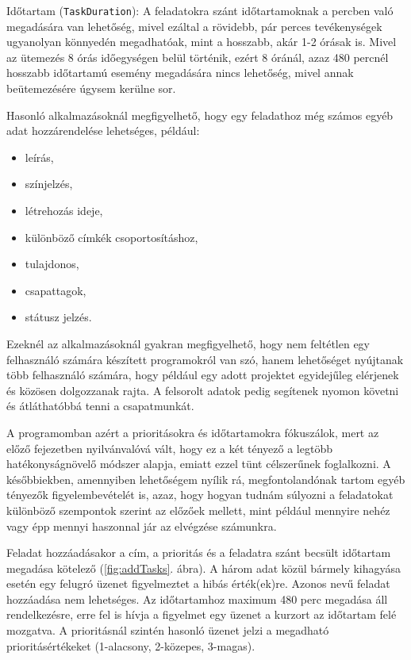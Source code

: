 Időtartam (\texttt{TaskDuration}): A feladatokra szánt időtartamoknak a percben való megadására van lehetőség, mivel ezáltal a rövidebb, pár perces tevékenységek ugyanolyan könnyedén megadhatóak, mint a hosszabb, akár 1-2 órásak is. Mivel az ütemezés 8 órás időegységen belül történik, ezért 8 óránál, azaz 480 percnél hosszabb időtartamú esemény megadására nincs lehetőség, mivel annak beütemezésére úgysem kerülne sor.

Hasonló alkalmazásoknál megfigyelhető, hogy egy feladathoz még számos egyéb adat hozzárendelése lehetséges, például:

\begin{itemize}
	\item leírás,
	\item színjelzés,
	\item létrehozás ideje,
	\item különböző címkék csoportosításhoz,
	\item tulajdonos,
	\item csapattagok,
	\item státusz jelzés.
\end{itemize}

Ezeknél az alkalmazásoknál gyakran megfigyelhető, hogy nem feltétlen egy felhasználó számára készített programokról van szó, hanem lehetőséget nyújtanak több felhasználó számára, hogy például egy adott projektet egyidejűleg elérjenek és közösen dolgozzanak rajta. A felsorolt adatok pedig segítenek nyomon követni és átláthatóbbá tenni a csapatmunkát.

A programomban azért a prioritásokra és időtartamokra fókuszálok, mert az előző fejezetben nyilvánvalóvá vált, hogy ez a két tényező a legtöbb hatékonyságnövelő módszer alapja, emiatt ezzel tünt célszerűnek foglalkozni. A későbbiekben, amennyiben lehetőségem nyílik rá, megfontolandónak tartom egyéb tényezők figyelembevételét is, azaz, hogy hogyan tudnám súlyozni a feladatokat különböző szempontok szerint az előzőek mellett, mint például mennyire nehéz vagy épp mennyi haszonnal jár az elvégzése számunkra. 


Feladat hozzáadásakor a cím, a prioritás és a feladatra szánt becsült időtartam megadása kötelező (\ref{fig:addTasks}. ábra). A három adat közül bármely kihagyása esetén egy felugró üzenet figyelmeztet a hibás érték(ek)re. Azonos nevű feladat hozzáadása nem lehetséges. Az időtartamhoz maximum 480 perc megadása áll rendelkezésre, erre fel is hívja a figyelmet egy üzenet a kurzort az időtartam felé mozgatva. A prioritásnál szintén hasonló üzenet jelzi a megadható prioritásértékeket (1-alacsony, 2-közepes, 3-magas).

